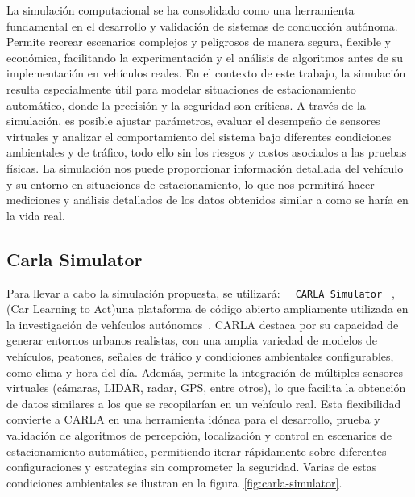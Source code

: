 
\noindent
La simulación computacional se ha consolidado como una herramienta fundamental en el desarrollo y validación de sistemas de conducción autónoma.
Permite recrear escenarios complejos y peligrosos de manera segura, flexible y económica, facilitando la experimentación 
y el análisis de algoritmos antes de su implementación en vehículos reales. 
En el contexto de este trabajo, la simulación resulta especialmente útil para modelar situaciones de estacionamiento automático,
donde la precisión y la seguridad son críticas. 
A través de la simulación, es posible ajustar parámetros, evaluar el desempeño de sensores virtuales 
y analizar el comportamiento del sistema bajo diferentes condiciones ambientales y de tráfico, 
todo ello sin los riesgos y costos asociados a las pruebas físicas.
La simulación nos puede proporcionar información detallada del vehículo y su entorno en situaciones de estacionamiento,
lo que nos permitirá hacer mediciones y análisis detallados de los datos obtenidos similar a como se haría en la vida real.

\subsection{Carla Simulator}\label{subsec:carla-simulator}
\noindent
Para llevar a cabo la simulación propuesta, se utilizará: \texttt{%
    \href{https://github.com/carla-simulator/carla}{%
        CARLA Simulator}%
}
, (Car Learning to Act)una plataforma de código abierto ampliamente utilizada en la investigación de vehículos autónomos~\cite{dosovitskiy2017carla}.
 CARLA destaca por su capacidad de generar entornos urbanos realistas, con una amplia variedad de modelos de vehículos, peatones, señales de tráfico
  y condiciones ambientales configurables, como clima y hora del día. 
  Además, permite la integración de múltiples sensores virtuales (cámaras, LIDAR, radar, GPS, entre otros),
   lo que facilita la obtención de datos similares a los que se recopilarían en un vehículo real. 
   Esta flexibilidad convierte a CARLA en una herramienta idónea para el desarrollo, prueba y validación de algoritmos de percepción, 
   localización y control en escenarios de estacionamiento automático, permitiendo iterar rápidamente sobre diferentes configuraciones 
   y estrategias sin comprometer la seguridad.
\noindent
Varias de estas condiciones ambientales se ilustran en la figura~\ref{fig:carla-simulator}.


